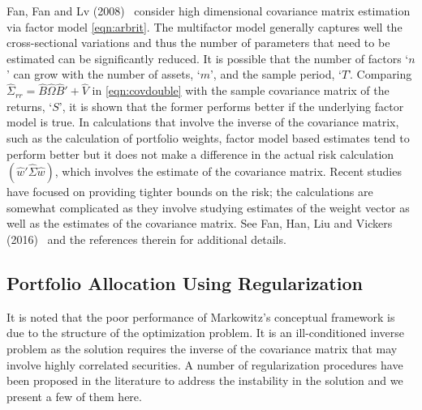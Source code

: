 Fan, Fan and Lv (2008)~\cite{fansq} consider high dimensional covariance matrix estimation via factor model \eqref{eqn:arbrit}. The multifactor model generally captures well the cross-sectional variations and thus the number of parameters that need to be estimated can be significantly reduced. It is possible that the number of factors `$n$' can grow with the number of assets, `$m$', and the sample period, `$T$'. Comparing $\hat{\Sigma}_{rr}= \hat{B} \hat{\Omega} \hat{B}' + \hat{V}$ in \eqref{eqn:covdouble} with the sample covariance matrix of the returns, `$S$', it is shown that the former performs better if the underlying factor model is true. In calculations that involve the inverse of the covariance matrix, such as the calculation of portfolio weights, factor model based estimates tend to perform better but it does not make a difference in the actual risk calculation $(\hat{w}' \hat{\Sigma} \hat{w})$, which involves the estimate of the covariance matrix. Recent studies have focused on providing tighter bounds on the risk; the calculations are somewhat complicated as they involve studying estimates of the weight vector as well as the estimates of the covariance matrix. See Fan, Han, Liu and Vickers (2016)~\cite{vickers} and the references therein for additional details.


\subsection{Portfolio Allocation Using Regularization}

It is noted that the poor performance of Markowitz's conceptual framework is due to the structure of the optimization problem. It is an ill-conditioned inverse problem as the solution requires the inverse of the covariance matrix that may involve highly correlated securities. A number of regularization procedures have been proposed in the literature to address the instability in the solution and we present a few of them here. \twomedskip


